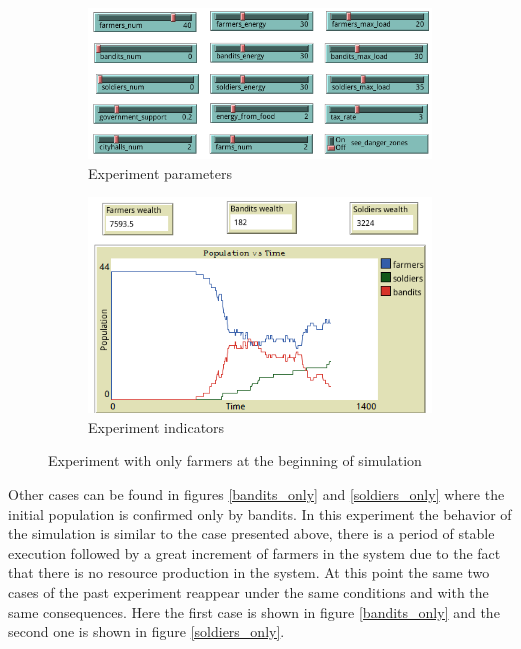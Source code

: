 \documentclass{wscpaperproc}
\begin{document}
\begin{figure}[h!]
    \begin{subfigure}{0.45\textwidth}
    \includegraphics[width=\textwidth]{Images/Exp2_sliders.png}
    \caption{Experiment parameters}
    \end{subfigure}
    \hfill
    \begin{subfigure}{0.45\textwidth}
    \includegraphics[width=\textwidth]{Images/Exp2_indicators.png}
    \caption{Experiment indicators}
    \end{subfigure}%
    \caption{Experiment with only farmers at the beginning of simulation}
    \label{only_farmers}
\end{figure}

Other cases can be found in figures \ref{bandits_only} and \ref{soldiers_only}
where the initial population is confirmed only by bandits. In this experiment
the behavior of the simulation is similar to the case presented above, there
is a period of stable execution followed by a great increment of farmers in
the system due to the fact that there is no resource production in the system.
At this point the same two cases of the past experiment reappear under the same
conditions and with the same consequences. Here the first case is shown in
figure \ref{bandits_only} and the second one is shown in figure
\ref{soldiers_only}.\\
\end{document}
